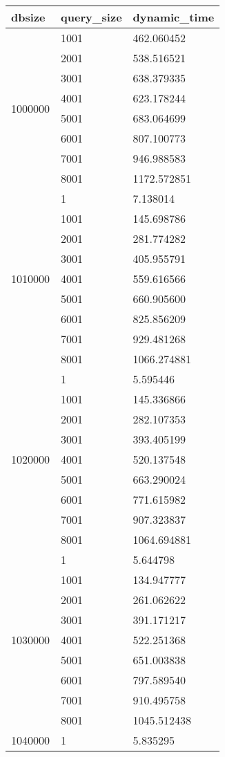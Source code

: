 \begin{table}[htb!]
\centering
\begin{tabular}{lll}
\toprule
dbsize & query_size & dynamic_time \\
\midrule
\multirow[c]{8}{*}{1000000} & 1001 & 462.060452 \\
 & 2001 & 538.516521 \\
 & 3001 & 638.379335 \\
 & 4001 & 623.178244 \\
 & 5001 & 683.064699 \\
 & 6001 & 807.100773 \\
 & 7001 & 946.988583 \\
 & 8001 & 1172.572851 \\
\multirow[c]{9}{*}{1010000} & 1 & 7.138014 \\
 & 1001 & 145.698786 \\
 & 2001 & 281.774282 \\
 & 3001 & 405.955791 \\
 & 4001 & 559.616566 \\
 & 5001 & 660.905600 \\
 & 6001 & 825.856209 \\
 & 7001 & 929.481268 \\
 & 8001 & 1066.274881 \\
\multirow[c]{9}{*}{1020000} & 1 & 5.595446 \\
 & 1001 & 145.336866 \\
 & 2001 & 282.107353 \\
 & 3001 & 393.405199 \\
 & 4001 & 520.137548 \\
 & 5001 & 663.290024 \\
 & 6001 & 771.615982 \\
 & 7001 & 907.323837 \\
 & 8001 & 1064.694881 \\
\multirow[c]{9}{*}{1030000} & 1 & 5.644798 \\
 & 1001 & 134.947777 \\
 & 2001 & 261.062622 \\
 & 3001 & 391.171217 \\
 & 4001 & 522.251368 \\
 & 5001 & 651.003838 \\
 & 6001 & 797.589540 \\
 & 7001 & 910.495758 \\
 & 8001 & 1045.512438 \\
\multirow[c]{9}{*}{1040000} & 1 & 5.835295 \\

\end{tabular}
\end{table}

